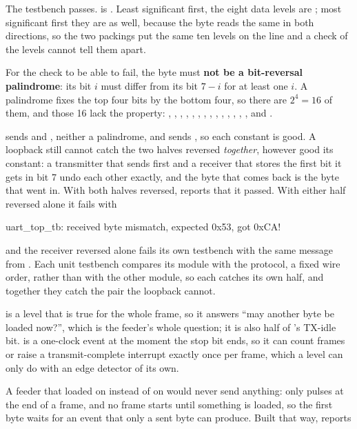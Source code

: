  The testbench passes.  is . Least significant first, the eight data
levels are ; most significant first they are
 as well, because the byte reads the same in both directions, so the two
packings put the same ten levels on the line and a check of the levels cannot tell them apart.

For the check to be able to fail, the byte must \textbf{not be a bit-reversal palindrome}: its bit
$i$ must differ from its bit $7 - i$ for at least one $i$. A palindrome fixes the top four bits by
the bottom four, so there are $2^4 = 16$ of them, and those 16 lack the property: ,
, , , , , , ,
, , , , , ,  and
.

 sends  and , neither a palindrome, and 
sends , so each constant is good. A loopback still cannot catch the two halves reversed
\emph{together}, however good its constant: a transmitter that sends  first and a
receiver that stores the first bit it gets in bit 7 undo each other exactly, and the byte that
comes back is the byte that went in. With both halves reversed,  reports that it
passed. With either half reversed alone it fails with

\begin{console}
uart_top_tb: received byte mismatch, expected 0x53, got 0xCA!
\end{console}

\noindent and the receiver reversed alone fails its own testbench with the same message from
. Each unit testbench compares its module with the protocol, a fixed wire order,
rather than with the other module, so each catches its own half, and together they catch the pair
the loopback cannot.

  is a level that is true for the whole frame, so it answers ``may another byte be
loaded now?'', which is the feeder's whole question; it is also half of 's TX-idle bit.
 is a one-clock event at the moment the stop bit ends, so it can count frames or raise a
transmit-complete interrupt exactly once per frame, which a level can only do with an edge detector
of its own.

A feeder that loaded on  instead of on  would never send anything:
 only pulses at the end of a frame, and no frame starts until something is loaded, so the
first byte waits for an event that only a sent byte can produce. Built that way, 
reports

